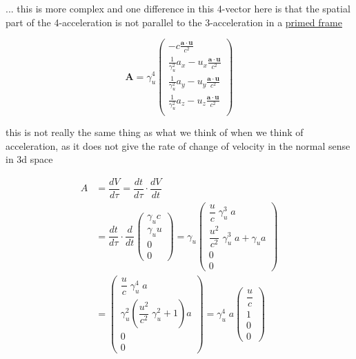 ... this is more complex and one difference in this 4-vector here is that the spatial part of the 4-acceleration is not parallel to the 3-acceleration in a \hyperlink{def-Primed-Frame}{primed frame}

\begin{equation}
	\mathbf{A} = {\gamma}_{u}^4
	\begin{pmatrix}
		-c\frac{\mathbf{a}\cdot\mathbf{u}}{{c}^2}                                  \\
		\frac{1}{{\gamma}_{u}^2} {{a}_{x}}-{{u}_{x}} \frac{\mathbf{a}\cdot\mathbf{u}}{{c}^2} \\
		\frac{1}{{\gamma}_{u}^2} {{a}_{y}}-{{u}_{y}} \frac{\mathbf{a}\cdot\mathbf{u}}{{c}^2} \\
		\frac{1}{{\gamma}_{u}^2} {{a}_{z}}-{{u}_{z}} \frac{\mathbf{a}\cdot\mathbf{u}}{{c}^2} \\
	\end{pmatrix}
\end{equation}

this is not really the same thing as what we think of when we think of acceleration, as it does not give the rate of change of velocity in the normal sense in 3d space

\begin{equation}
	\begin{aligned}
		A & = \dfrac{dV}{d\tau} =
		\dfrac{dt}{d\tau}\cdot\dfrac{dV}{dt}                                                                                                                                   \\
		  & = \dfrac{dt}{d\tau}\cdot \dfrac{d}{dt}
		\left(\begin{array}{*{20}{c}} {\gamma}_{u}{c}\\ {\gamma}_{u} u \\ 0 \\ 0 \end{array}\right)
		 = {\gamma}_{u}
		\left(\begin{array}{*{20}{c}} \dfrac{u}{c}\;{\gamma}_{u}^3\;a \\ \dfrac{u^2}{{c}^2}\;{\gamma}_{u}^3\;a + {\gamma}_{u} a \\ 0 \\ 0 \end{array}\right) \\
		  & =
		\left(\begin{array}{*{20}{c}} \dfrac{u}{c}\;{\gamma}_{u}^4\;a \\ {\gamma}_{u}^2\left(\dfrac{u^2}{{c}^2}\;{\gamma}_{u}^2 + 1\right)a \\ 0 \\ 0 \end{array}\right)
		 = {\gamma}_{u}^4\;a
		\left(\begin{array}{*{2}{c}} \dfrac{u}{c} \\ 1 \\ 0 \\ 0 \end{array}\right)
	\end{aligned}
\end{equation}

